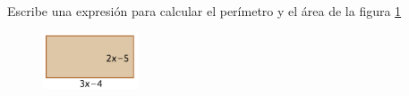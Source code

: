 Escribe una expresión para calcular el perímetro y el área de la figura \ref{fig:20230319044552}

\begin{figure}[H]
    \centering
    \includegraphics[width=0.25\textwidth]{../images/20230319044552}
    \caption{}
    \label{fig:20230319044552}
\end{figure}